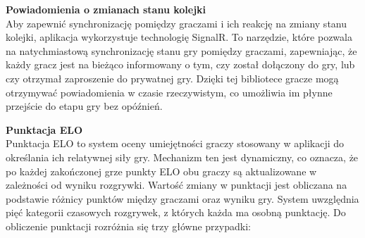 \documentclass[12pt,a4paper]{article}
\begin{document}
\noindent \textbf{Powiadomienia o zmianach stanu kolejki}\\
Aby zapewnić synchronizację pomiędzy graczami i ich reakcję na zmiany stanu kolejki, aplikacja wykorzystuje technologię SignalR. To narzędzie, które pozwala na natychmiastową synchronizację stanu gry pomiędzy graczami, zapewniając, że każdy gracz jest na bieżąco informowany o tym, czy został dołączony do gry, lub czy otrzymał zaproszenie do prywatnej gry. Dzięki tej bibliotece gracze mogą otrzymywać powiadomienia w czasie rzeczywistym, co umożliwia im płynne przejście do etapu gry bez opóźnień.

\newpage

\noindent \textbf{Punktacja ELO}\\
Punktacja ELO to system oceny umiejętności graczy stosowany w aplikacji do określania ich relatywnej siły gry. Mechanizm ten jest dynamiczny, co oznacza, że po każdej zakończonej grze punkty ELO obu graczy są aktualizowane w zależności od wyniku rozgrywki. Wartość zmiany w punktacji jest obliczana na podstawie różnicy punktów między graczami oraz wyniku gry. System uwzględnia pięć kategorii czasowych rozgrywek, z których każda ma osobną punktację. Do obliczenie punktacji rozróżnia się trzy główne przypadki:
\end{document}

